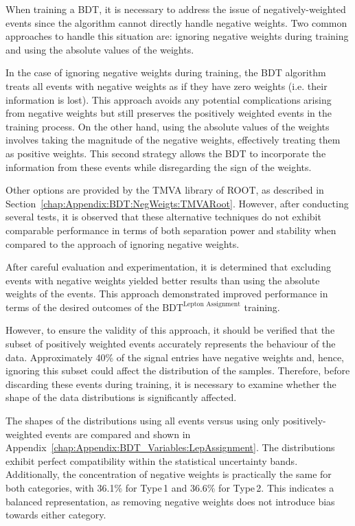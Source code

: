 When training a BDT, it is necessary to address the issue of negatively-weighted events since the algorithm
cannot directly handle negative weights. Two common approaches to handle this situation are: 
ignoring negative weights during training and using the absolute values of the weights. 

In the case of ignoring negative weights during training, the BDT algorithm treats all 
events with negative weights as if they have zero weights (i.e. their information is lost). 
This approach avoids any potential complications arising from negative weights but 
still preserves the positively weighted events in the training process. On the other hand, 
using the absolute values of the weights involves taking the magnitude of the negative weights, 
effectively treating them as positive weights. This second strategy allows the BDT to 
incorporate the information from these events while disregarding the sign of the weights.

Other options are provided by the TMVA library of ROOT, as described in 
Section~\ref{chap:Appendix:BDT:NegWeigts:TMVARoot}. However, after conducting several tests, 
it is observed that these alternative techniques do not exhibit comparable performance 
in terms of both separation power and stability when compared to the approach of ignoring 
negative weights.

After careful evaluation and experimentation, it is determined that excluding events with 
negative weights yielded better results than using the absolute weights of the events. This 
approach demonstrated improved performance in terms of the desired outcomes of the
$\text{BDT}^{\text{Lepton Assignment}}$ training.

However, to ensure the validity of this approach, it should be verified that the subset of positively 
weighted events accurately represents the behaviour of the data. Approximately 40\% of the signal 
entries have negative weights and, hence, ignoring this subset could affect the distribution of the samples. 
Therefore, before discarding these events during training, it is necessary to examine whether the 
shape of the data distributions is significantly affected.

The shapes of the distributions using all events versus using only positively-weighted events
are compared and shown in Appendix~\ref{chap:Appendix:BDT_Variables:LepAssignment}.
The distributions exhibit 
perfect compatibility within the statistical uncertainty bands. Additionally, the concentration of negative weights is practically 
the same for both categories, with 36.1\% for Type$\,$1 and 36.6\% for Type$\,$2. This indicates a balanced
representation, as removing negative weights does not introduce bias towards either category.

